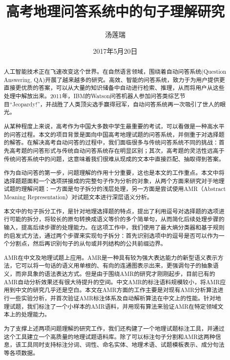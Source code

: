 \documentclass[master, winfont]{njuthesis}
\title{高考地理问答系统中的句子理解研究}
\author{汤莲瑞}
\institute{南京大学}
\date{2017年5月20日}
\begin{document}

\maketitle
\makeenglishtitle


\frontmatter

\begin{abstract}
人工智能技术正在飞速改变这个世界。在自然语言领域，围绕着自动问答系统(Question Answering, QA)开展了越来越多的研究。高效、智能的问答系统，致力于为用户提供更直接更优质的答案，可以从大量的知识储备中自动进行检索、推理，从而将用户从这些处理中解放出来。2011年，IBM的Watson问答机器人参加问答类综艺节目“Jeopardy!”，并战胜了人类顶尖选手赢得冠军，自动问答系统再一次吸引了世人的眼光。

从某种程度上来说，高考作为中国大多数中学生最重要的考试，可以看做是一种高水平的问答过程。本文的项目背景是面向中国高考地理试题的问答系统，并侧重于对选择题的解答。在解决高考自动问答的过程中，我们面临很多与传统问答系统不同的挑战：首先高考题的问答形式与传统自动问答系统存在明显区别；其次，高考题的灵活性远高于传统问答系统中的问题，这意味着我们很难从现成的文本中直接匹配、抽取得到答案。

作为自动问答的第一步，问题理解的作用十分重要，这也是本文的工作重点。本文中将选择题题面和一个选项拼接成的完整句子作为分析的对象，从两个方面来研究对于地理试题的理解问题：一方面是句子拆分的浅层处理，另一方面是尝试使用AMR（Abstract Meaning Representation）对试题文本进行深层语义分析。

本文中的句子拆分工作，是针对地理选择题的特点，提出了利用逗号对选择题的选项进行可能的拆分，将较长的原句转换成语义等价的多个简单句，从而简化后续处理步骤的输入，提高后续步骤的处理能力。在这项工作中，我们使用了最大熵分类器和基于规则的启发式方法，通过两个步骤来实现句子拆分：首先识别选项中的逗号是否可以作为一个分割点，然后再识别句子的从句或并列结构的公共前缀边界。

AMR在中文及地理试题上应用。AMR是一种具有较为强大表达能力的新型语义表示方法，它可以将一句话的语义用单根的、有向的连通图表示出来，更强调句子的抽象语义，而非具象的语法表达方式。但是由于围绕AMR的研究才刚刚起步，目前已有的AMR自动分析效果还有很大待提升的空间。中文AMR的标注语料规模较小，将AMR应用到中文的研究几乎还是空白。本文在AMR方面的工作主要是对现有AMR分析算法进行一些实验分析，并首次验证AMR标注体系及自动解析算法在中文上的性能。针对地理试题，我们标注了一个小样本的AMR语料，并用现有算法来验证AMR在特定领域文本上的处理能力。

为了支撑上述两项问题理解的研究工作，我们还构建了一个地理试题标注工具，并通过这个工具建立一个高质量的地理试题语料库。除了可以标注句子分割和AMR这两种信息，该工具同时支持标注分词、词性、命名实体、地理术语、试题模板表示、成分句法等各项数据。

\end{abstract}
\end{document}
